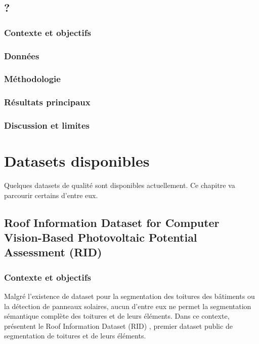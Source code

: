 \subsection{?}

\subsubsection{Contexte et objectifs}

\subsubsection{Données}

\subsubsection{Méthodologie}

\subsubsection{Résultats principaux}

\subsubsection{Discussion et limites}

\section{Datasets disponibles}
\label{sec:dataset_disponible}
\par{Quelques datasets de qualité sont disponibles actuellement. Ce chapitre va parcourir certains d'entre eux.}

\subsection{Roof Information Dataset for Computer Vision-Based Photovoltaic Potential Assessment (RID)}
\label{subsec:rid_roof_information_dataset}

\subsubsection{Contexte et objectifs}
\par{Malgré l'existence de dataset pour la segmentation des toitures des bâtiments ou la détection de panneaux solaires, aucun d'entre eux ne permet la segmentation sémantique complète des toitures et de leurs éléments. Dans ce contexte, \citeauthor{krapf_ridroof_2022} présentent le Roof Information Dataset (RID) \cite{krapf_ridroof_2022}, premier dataset public de segmentation de toitures et de leurs éléments.}

